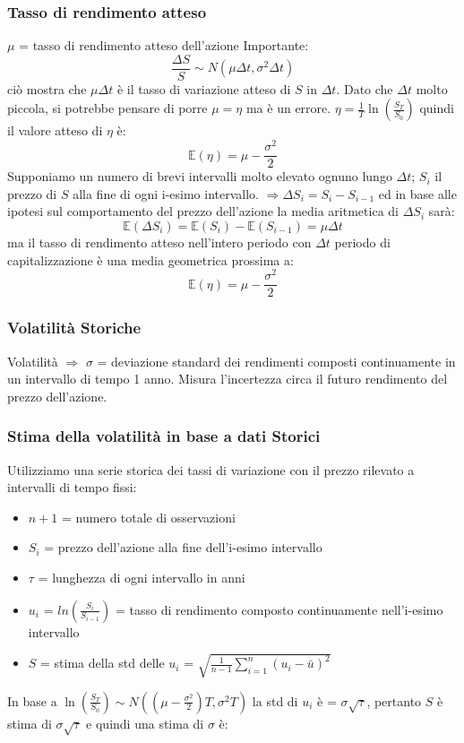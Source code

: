 \documentclass[12pt,a4paper]{report}
\begin{document}
\subsubsection{Tasso di rendimento atteso}
\(\mu\) = tasso di rendimento atteso dell'azione
Importante:
\[\frac{\Delta S}{S} \sim N\left( \mu \Delta t, \sigma^2 \Delta t \right)\]
ciò mostra che \(\mu \Delta t\) è il tasso di variazione atteso di \(S\) in \(\Delta t\).
\newline
Dato che \(\Delta t\) molto piccola, si potrebbe pensare di porre \(\mu = \eta\) ma è un errore.
\newline
\(\eta = \frac{1}{T} \ln\left(\frac{S_T}{S_0}\right)\) quindi il valore atteso di \(\eta\) è:
\[
\mathbb{E}(\eta) = \mu - \frac{\sigma^2}{2}
\]
Supponiamo un numero di brevi intervalli molto elevato ognuno lungo \(\Delta t\); \(S_i\) il prezzo di \(S\) alla fine di ogni i-esimo intervallo.
\newline
\(\Longrightarrow \Delta S_i = S_i - S_{i-1}\) ed in base alle ipotesi sul comportamento del prezzo dell'azione la media aritmetica di \(\Delta S_i\) sarà:
\[
\mathbb{E}(\Delta S_i) = \mathbb{E}(S_i) - \mathbb{E}(S_{i-1}) = \mu \Delta t
\]
ma il tasso di rendimento atteso nell'intero periodo con \(\Delta t\) periodo di capitalizzazione è una media geometrica prossima a:
\[
\mathbb{E}(\eta) = \mu - \frac{\sigma^2}{2}
\]
\newpage
\subsubsection{Volatilità Storiche}
Volatilità \(\Longrightarrow\) \(\sigma\) = deviazione standard dei rendimenti composti continuamente in un intervallo di tempo 1 anno.
Misura l'incertezza circa il futuro rendimento del prezzo dell'azione.
\subsubsection{Stima della volatilità in base a dati Storici}
Utilizziamo una serie storica dei tassi di variazione con il prezzo rilevato a intervalli di tempo fissi:
\begin{itemize}
    \item \(n+1\) = numero totale di osservazioni
    \item \(S_i\) = prezzo dell'azione alla fine dell'i-esimo intervallo
    \item \(\tau\) = lunghezza di ogni intervallo in anni
    \item \(u_i\) = \(ln(\frac{S_i}{S_{i-1}})\) = tasso di rendimento composto continuamente nell'i-esimo intervallo
    \item \(S\) = stima della std delle \(u_i\) = \(\sqrt{\frac{1}{n-1} \sum_{i=1}^{n} (u_i - \bar{u})^2}\)
\end{itemize}
In base a \(\ln(\frac{S_T}{S_0}) \sim N\left( \left( \mu - \frac{\sigma^2}{2} \right) T, \sigma^2 T \right)\) la std di \(u_i\) è = \(\sigma \sqrt{\tau}\), pertanto \(S\) è stima di \(\sigma \sqrt{\tau}\) e quindi una stima di \(\sigma\) è:
\end{document}
